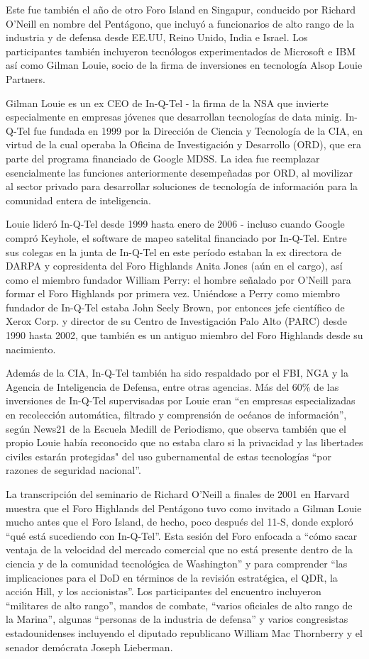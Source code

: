 \documentclass[10pt,a5paper,twoside,spanish,]{book}
\begin{document}
Este fue también el año de otro Foro Island en Singapur, conducido por
Richard O'Neill en nombre del Pentágono, que incluyó a funcionarios de
alto rango de la industria y de defensa desde EE.UU, Reino Unido, India
e Israel. Los participantes también incluyeron tecnólogos experimentados
de Microsoft e IBM así como Gilman Louie, socio de la firma de
inversiones en tecnología Alsop Louie Partners.

Gilman Louie es un ex CEO de In-Q-Tel - la firma de la NSA que invierte
especialmente en empresas jóvenes que desarrollan tecnologías de data
minig. In-Q-Tel fue fundada en 1999 por la Dirección de Ciencia y
Tecnología de la CIA, en virtud de la cual operaba la Oficina de
Investigación y Desarrollo (ORD), que era parte del programa financiado
de Google MDSS. La idea fue reemplazar esencialmente las funciones
anteriormente desempeñadas por ORD, al movilizar al sector privado para
desarrollar soluciones de tecnología de información para la comunidad
entera de inteligencia.

Louie lideró In-Q-Tel desde 1999 hasta enero de 2006 - incluso cuando
Google compró Keyhole, el software de mapeo satelital financiado por
In-Q-Tel. Entre sus colegas en la junta de In-Q-Tel en este período
estaban la ex directora de DARPA y copresidenta del Foro Highlands Anita
Jones (aún en el cargo), así como el miembro fundador William Perry: el
hombre señalado por O'Neill para formar el Foro Highlands por primera
vez. Uniéndose a Perry como miembro fundador de In-Q-Tel estaba John
Seely Brown, por entonces jefe científico de Xerox Corp. y director de
su Centro de Investigación Palo Alto (PARC) desde 1990 hasta 2002, que
también es un antiguo miembro del Foro Highlands desde su nacimiento.

Además de la CIA, In-Q-Tel también ha sido respaldado por el FBI, NGA y
la Agencia de Inteligencia de Defensa, entre otras agencias. Más del
60\% de las inversiones de In-Q-Tel supervisadas por Louie eran ``en
empresas especializadas en recolección automática, filtrado y
comprensión de océanos de información'', según News21 de la Escuela
Medill de Periodismo, que observa también que el propio Louie había
reconocido que no estaba claro si la privacidad y las libertades civiles
estarán protegidas" del uso gubernamental de estas tecnologías ``por
razones de seguridad nacional''.

La transcripción del seminario de Richard O'Neill a finales de 2001 en
Harvard muestra que el Foro Highlands del Pentágono tuvo como invitado a
Gilman Louie mucho antes que el Foro Island, de hecho, poco después del
11-S, donde exploró ``qué está sucediendo con In-Q-Tel''. Esta sesión
del Foro enfocada a ``cómo sacar ventaja de la velocidad del mercado
comercial que no está presente dentro de la ciencia y de la comunidad
tecnológica de Washington'' y para comprender ``las implicaciones para
el DoD en términos de la revisión estratégica, el QDR, la acción Hill, y
los accionistas''. Los participantes del encuentro incluyeron
``militares de alto rango'', mandos de combate, ``varios oficiales de
alto rango de la Marina'', algunas ``personas de la industria de
defensa'' y varios congresistas estadounidenses incluyendo el diputado
republicano William Mac Thornberry y el senador demócrata Joseph
Lieberman.
\end{document}
